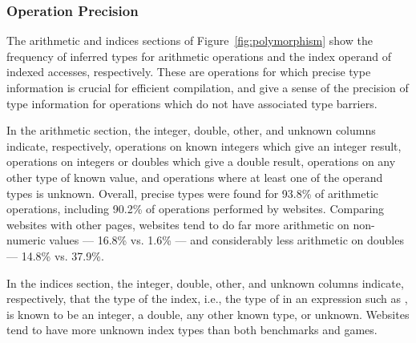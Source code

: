 \subsubsection{Operation Precision}
\label{sec:operations}

The arithmetic and indices sections of Figure~\ref{fig:polymorphism} show the frequency
of inferred types for arithmetic operations and the index operand of
indexed accesses, respectively.
These are operations for which precise type information is crucial
for efficient compilation, and give a sense of the precision of type
information for operations which do not have associated type barriers.

In the arithmetic section, the integer, double, other, and unknown columns indicate,
respectively,
operations on known integers which give an integer result,
operations on integers or doubles which give a double result,
operations on any other type of known value,
and operations where at least one of the operand types is unknown.
Overall, precise types were found for 93.8\% of arithmetic operations,
including 90.2\% of operations performed by websites.
Comparing websites with other pages, websites tend to do far more
arithmetic on non-numeric values --- 16.8\% vs. 1.6\% ---
and considerably less arithmetic on doubles --- 14.8\% vs. 37.9\%.

In the indices section, the integer, double, other, and
unknown columns indicate, respectively, that the type of the index, i.e.,
the type of  in an expression such as , is known
to be an integer, a double, any other known type, or unknown. Websites tend to
have more unknown index types than both benchmarks and games.

